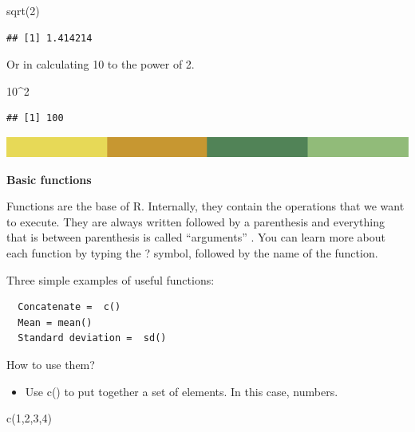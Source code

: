 \documentclass[
]{book}
\newenvironment{Shaded}{\begin{snugshade}}{\end{snugshade}}
\newcommand{\DecValTok}[1]{\textcolor[rgb]{0.00,0.00,0.81}{#1}}
\newcommand{\FunctionTok}[1]{\textcolor[rgb]{0.00,0.00,0.00}{#1}}
\newcommand{\NormalTok}[1]{#1}
\newcommand{\SpecialCharTok}[1]{\textcolor[rgb]{0.00,0.00,0.00}{#1}}
\providecommand{\tightlist}{%
  \setlength{\itemsep}{0pt}\setlength{\parskip}{0pt}}
\begin{document}
\begin{Shaded}
\begin{Highlighting}[]
\FunctionTok{sqrt}\NormalTok{(}\DecValTok{2}\NormalTok{)}
\end{Highlighting}
\end{Shaded}

\begin{verbatim}
## [1] 1.414214
\end{verbatim}

Or in calculating 10 to the power of 2.

\begin{Shaded}
\begin{Highlighting}[]
\DecValTok{10}\SpecialCharTok{\^{}}\DecValTok{2}
\end{Highlighting}
\end{Shaded}

\begin{verbatim}
## [1] 100
\end{verbatim}

\includegraphics{rsrstrip.png}

\textbf{Basic functions}

Functions are the base of R. Internally, they contain the operations that we want to execute. They are always written followed by a parenthesis and everything that is between parenthesis is called ``arguments'' . You can learn more about each function by typing the ? symbol, followed by the name of the function.

Three simple examples of useful functions:

\begin{verbatim}
  Concatenate =  c() 
  Mean = mean()
  Standard deviation =  sd()
\end{verbatim}

How to use them?

\begin{itemize}
\tightlist
\item
  Use c() to put together a set of elements. In this case, numbers.
\end{itemize}

\begin{Shaded}
\begin{Highlighting}[]
\FunctionTok{c}\NormalTok{(}\DecValTok{1}\NormalTok{,}\DecValTok{2}\NormalTok{,}\DecValTok{3}\NormalTok{,}\DecValTok{4}\NormalTok{)}
\end{Highlighting}
\end{Shaded}
\end{document}
